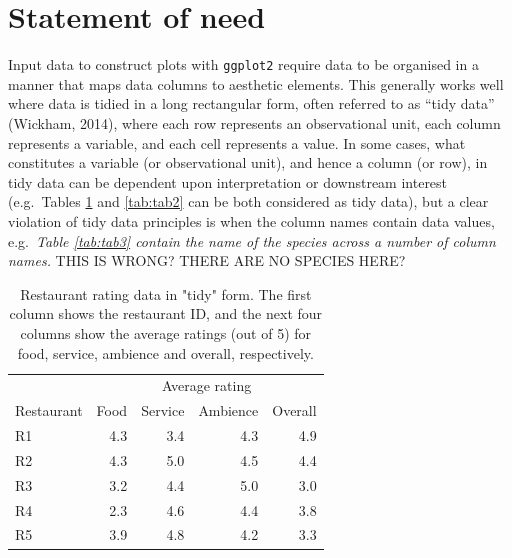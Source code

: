 \documentclass[10pt,a4paper,onecolumn]{article}
\begin{document}
\hypertarget{statement-of-need}{%
\section{Statement of need}\label{statement-of-need}}

Input data to construct plots with \texttt{ggplot2} require data to be
organised in a manner that maps data columns to aesthetic elements. This
generally works well where data is tidied in a long rectangular form,
often referred to as ``tidy data'' (Wickham, 2014), where each row
represents an observational unit, each column represents a variable, and
each cell represents a value. In some cases, what constitutes a variable
(or observational unit), and hence a column (or row), in tidy data can
be dependent upon interpretation or downstream interest (e.g.~Tables
\ref{tab:tab1} and \ref{tab:tab2} can be both considered as tidy data),
but a clear violation of tidy data principles is when the column names
contain data values, e.g.~\emph{Table \ref{tab:tab3} contain the name of
the species across a number of column names.} THIS IS WRONG? THERE ARE
NO SPECIES HERE?

\begin{table}

\caption{\label{tab:tab1}Restaurant rating data in "tidy" form. The first column shows the restaurant ID, and the next four columns show the average ratings (out of 5) for food, service, ambience and overall, respectively.}
\centering
\begin{tabular}[t]{lrrrr}
\toprule
\multicolumn{1}{c}{ } & \multicolumn{4}{c}{Average rating} \\
\cmidrule(l{3pt}r{3pt}){2-5}
Restaurant & Food & Service & Ambience & Overall\\
\midrule
R1 & 4.3 & 3.4 & 4.3 & 4.9\\
R2 & 4.3 & 5.0 & 4.5 & 4.4\\
R3 & 3.2 & 4.4 & 5.0 & 3.0\\
R4 & 2.3 & 4.6 & 4.4 & 3.8\\
R5 & 3.9 & 4.8 & 4.2 & 3.3\\
\bottomrule
\end{tabular}
\end{table}
\end{document}
